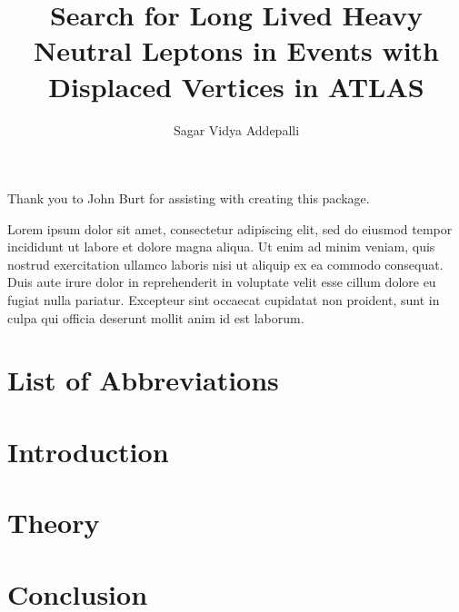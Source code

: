 \documentclass{brandeis-dissertation3.14}
\title{Search for Long Lived Heavy Neutral Leptons in Events with Displaced Vertices in ATLAS }
\author{Sagar Vidya Addepalli}
\begin{document}
\maketitlepage
\makeapproval
\frontmatter

\begin{dissertation-acknowledgements}
Thank you to John Burt for assisting with creating this package.
\end{dissertation-acknowledgements}

\begin{dissertation-abstract}
Lorem ipsum dolor sit amet, consectetur adipiscing elit, sed do eiusmod tempor incididunt ut labore et dolore magna aliqua. Ut enim ad minim veniam, quis nostrud exercitation ullamco laboris nisi ut aliquip ex ea commodo consequat. Duis aute irure dolor in reprehenderit in voluptate velit esse cillum dolore eu fugiat nulla pariatur. Excepteur sint occaecat cupidatat non proident, sunt in culpa qui officia deserunt mollit anim id est laborum.
\end{dissertation-abstract}

\doublespacing

\tableofcontents{}

\clearpage

\listoftables
\pagebreak
{}
\listoffigures
\pagebreak
\chapter{List of Abbreviations}

\startbody

\chapter{Introduction}
\label{chap:intro}


\chapter{Theory}
\label{chap:theory}


\chapter{Conclusion}
\label{chap:conclusion}




\end{document}

